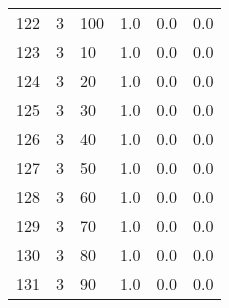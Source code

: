\documentclass{article}
\begin{document}
\begin{center}
\begin{tabular}{llllll}
122 &         3 &        100 &              1.0 &                       0.0 &                                   0.0 \\
123 &         3 &         10 &              1.0 &                       0.0 &                                   0.0 \\
124 &         3 &         20 &              1.0 &                       0.0 &                                   0.0 \\
125 &         3 &         30 &              1.0 &                       0.0 &                                   0.0 \\
126 &         3 &         40 &              1.0 &                       0.0 &                                   0.0 \\
127 &         3 &         50 &              1.0 &                       0.0 &                                   0.0 \\
128 &         3 &         60 &              1.0 &                       0.0 &                                   0.0 \\
129 &         3 &         70 &              1.0 &                       0.0 &                                   0.0 \\
130 &         3 &         80 &              1.0 &                       0.0 &                                   0.0 \\
131 &         3 &         90 &              1.0 &                       0.0 &                                   0.0 \\
\bottomrule
\end{tabular}
\end{center}
\newpage
\end{document}
